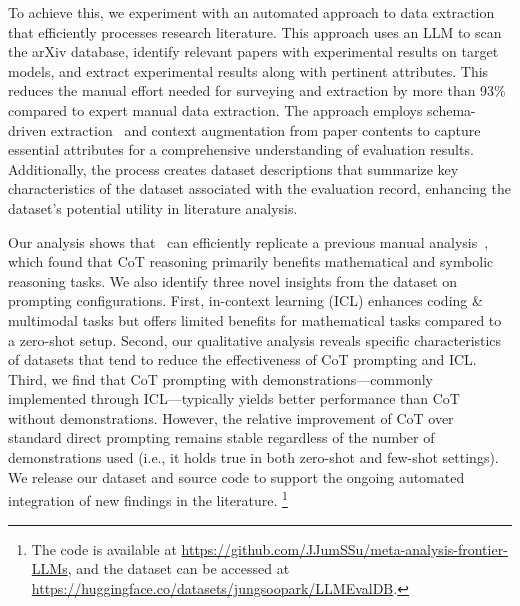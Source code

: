 To achieve this, we experiment with an automated approach to data extraction that efficiently processes research literature. 
This approach uses an LLM to scan the arXiv database, identify relevant papers with experimental results on target models, and extract experimental results along with pertinent attributes. 
This reduces the manual effort needed for surveying and extraction by more than 93\% compared to expert manual data extraction.
The approach employs schema-driven extraction~\citep{bai2023schema} and context augmentation from paper contents to capture essential attributes for a comprehensive understanding of evaluation results. 
Additionally, the process creates dataset descriptions that summarize key characteristics of the dataset associated with the evaluation record, enhancing the dataset's potential utility in literature analysis. 

Our analysis shows that \datasetname~can efficiently replicate a previous manual analysis~\citep{sprague2024cot}, which found that CoT reasoning primarily benefits mathematical and symbolic reasoning tasks. 
We also identify three novel insights from the dataset on prompting configurations. 
First, in-context learning (ICL) enhances coding \& multimodal tasks but offers limited benefits for mathematical tasks compared to a zero-shot setup. 
Second, our qualitative analysis reveals specific characteristics of datasets that tend to reduce the effectiveness of CoT prompting and ICL.
Third, we find that CoT prompting with demonstrations—commonly implemented through ICL—typically yields better performance than CoT without demonstrations.
However, the relative improvement of CoT over standard direct prompting remains stable regardless of the number of demonstrations used (i.e., it holds true in both zero-shot and few-shot settings).
We release our dataset and source code to support the ongoing automated integration of new findings in the literature.
\footnote{The code is available at \url{https://github.com/JJumSSu/meta-analysis-frontier-LLMs}, and the dataset can be accessed at \url{https://huggingface.co/datasets/jungsoopark/LLMEvalDB}.}





